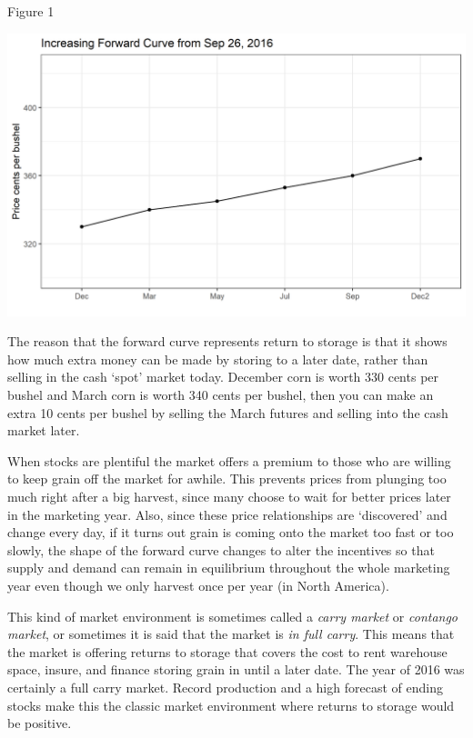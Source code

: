 \documentclass[
  letterpaper,
  DIV=11,
  numbers=noendperiod]{scrreprt}
\begin{document}
Figure 1

\includegraphics{assets/PricesSpaceTime-increasing-9-26-2016.png}

The reason that the forward curve represents return to storage is that
it shows how much extra money can be made by storing to a later date,
rather than selling in the cash `spot' market today. December corn is
worth 330 cents per bushel and March corn is worth 340 cents per bushel,
then you can make an extra 10 cents per bushel by selling the March
futures and selling into the cash market later.

When stocks are plentiful the market offers a premium to those who are
willing to keep grain off the market for awhile. This prevents prices
from plunging too much right after a big harvest, since many choose to
wait for better prices later in the marketing year. Also, since these
price relationships are `discovered' and change every day, if it turns
out grain is coming onto the market too fast or too slowly, the shape of
the forward curve changes to alter the incentives so that supply and
demand can remain in equilibrium throughout the whole marketing year
even though we only harvest once per year (in North America).

This kind of market environment is sometimes called a \emph{carry
market} or \emph{contango market}, or sometimes it is said that the
market is \emph{in full carry}. This means that the market is offering
returns to storage that covers the cost to rent warehouse space, insure,
and finance storing grain in until a later date. The year of 2016 was
certainly a full carry market. Record production and a high forecast of
ending stocks make this the classic market environment where returns to
storage would be positive.
\end{document}
